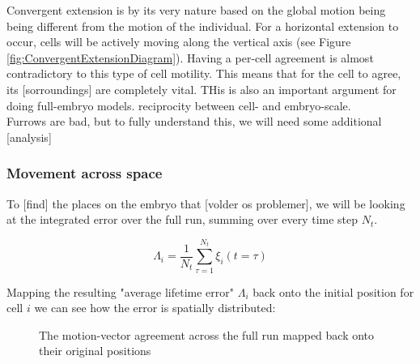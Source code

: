 Convergent extension is by its very nature based on the global motion being being different from the motion of the individual. For a horizontal extension to occur, cells will be actively moving along the vertical axis (see Figure \ref{fig:ConvergentExtensionDiagram}). Having a per-cell agreement is almost contradictory to this type of cell motility. This means that for the cell to agree, its [sorroundings] are completely vital. THis is also an important argument for doing full-embryo models. reciprocity between cell- and embryo-scale.
\\

 

Furrows are bad, but to fully understand this, we will need some additional [analysis]\\

\subsubsection{Movement across space}

To [find] the places on the embryo that [volder os problemer], we will be looking at the integrated error over the full run, summing over every time step $N_t$.

\begin{equation}
     \Lambda_i = \frac{1}{N_t}\sum_{\tau = 1}^{N_t}\xi_i(t=\tau)
\end{equation}

Mapping the resulting "average lifetime error" $\Lambda_i$ back onto the initial position for cell $i$ we can see how the error is spatially distributed:
\begin{figure}[H]
    \centering
    \caption{The motion-vector agreement across the full run mapped back onto their original positions }
    \label{fig:}
\end{figure}



